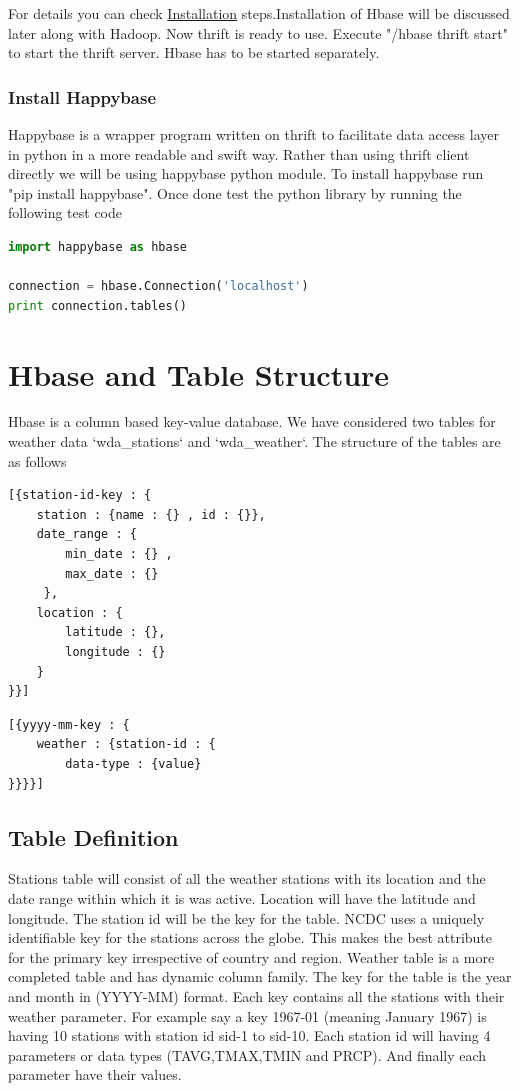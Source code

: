 \documentclass[9pt,twocolumn,twoside]{../../styles/osajnl}
\begin{document}
For details you can check \href{https://acadgild.com/blog/connecting-hbase-with-python-application-using-thrift-server/}{Installation} steps.Installation of Hbase will be discussed later along with Hadoop.
Now thrift is ready to use. Execute "/hbase thrift start" to start the thrift server. Hbase has to be started separately.
\subsubsection{Install Happybase \cite{happybase-install}}
Happybase is a wrapper program written on thrift to facilitate data access layer in python in a more readable and swift way. Rather than using thrift client directly we will be using happybase python module. To install happybase run "pip install happybase". 
Once done test the python library by running the following test code 
\begin{lstlisting}[language=Python,caption=Connect-Hbase,breaklines=true]
import happybase as hbase               

connection = hbase.Connection('localhost')
print connection.tables()
\end{lstlisting}

\section{Hbase and Table Structure}
Hbase \cite{hbase} is a column based key-value database. We have considered two tables for weather data `wda\_stations` and `wda\_weather`. The structure of the tables are as follows

\begin{lstlisting}[label=JSON,caption=WDA\_STATIONS Table,breaklines=true]
[{station-id-key : {
    station : {name : {} , id : {}},
    date_range : {
        min_date : {} ,
        max_date : {}
     },
    location : {
        latitude : {},
        longitude : {}
    }
}}]
\end{lstlisting}
\begin{lstlisting}[label=JSON,caption=WDA\_WEATHER Table,breaklines=true]
[{yyyy-mm-key : {
    weather : {station-id : {
        data-type : {value}         
}}}}]
\end{lstlisting}
\subsection{Table Definition}
Stations table will consist of all the weather stations with its location and the date range within which it is was active. Location will have the latitude and longitude. The station id will be the key for the table. NCDC uses a uniquely identifiable key for the stations across the globe. This makes the best attribute for the primary key irrespective of country and region. Weather table is a more completed table and has dynamic column family. The key for the table is the year and month in (YYYY-MM) format. Each key contains all the stations with their weather parameter. For example say a key 1967-01 (meaning January 1967) is having 10 stations with station id sid-1 to sid-10. Each station id will having 4 parameters or data types (TAVG,TMAX,TMIN and PRCP). And finally each parameter have their values. 
\end{document}
